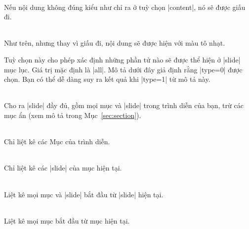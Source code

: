 \begin{description}
\item{}\\
Nếu nội dung không đúng kiểu như chỉ ra ở tuỳ chọn |content|, nó sẽ được
giấu đi.
\item{}\\
Như trên, nhưng thay vì giấu đi, nội dung sẽ được hiện với màu tô nhạt.
\end{description}

Tuỳ chọn này cho phép xác định những phần tử nào sẽ được thể hiện ở
|slide| mục lục. Giá trị mặc định là |all|. Mô tả dưới đây giả định rằng
|type=0| được chọn. Bạn có thể dễ dàng suy ra kết quả khi |type=1| từ mô tả này.

\begin{description}
\item{}\\
Cho ra |slide| đầy đủ, gồm mọi mục và |slide| trong trình diễn
của bạn, trừ các mục ẩn (xem mô tả trong Mục~\vref{sec:section}). 
\item{}\\
Chỉ liệt kê các Mục của trình diễn.
\item{}\\
Chỉ liệt kê các |slide| của mục hiện tại.
\item{}\\
Liệt kê mọi mục và |slide| bắt đầu từ |slide| hiện tại.
\item{}\\
Liệt kê mọi mục bắt đầu từ mục hiện tại.
\end{description}

